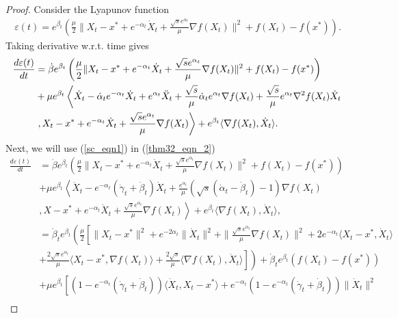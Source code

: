 \documentclass{article}
\theoremstyle{plain}
\theoremstyle{definition}
\theoremstyle{remark}
\begin{document}
\begin{proof}
    Consider the Lyapunov function
    \begin{align}\label{thm32_eqn_1}
        \varepsilon(t) = e^{\beta_t}\left(\frac{\mu}{2}\|X_t-x^*+e^{-\alpha_t}\dot X_t+\frac{\sqrt{s}e^{\alpha_t}}{\mu}\nabla f(X_t)\|^2+f(X_t)-f(x^*)\right).
    \end{align}
    Taking derivative w.r.t. time gives
    \begin{align}\label{thm32_eqn_2}
       \frac{d\varepsilon(t)}{dt}&=\dot \beta e^{\beta_t}\left(\frac{\mu}{2}\|X_t-x^*+e^{-\alpha_t}\dot X_t+\frac{\sqrt{s}e^{\alpha_t}}{\mu}\nabla f(X_t)\|^2+f(X_t)-f(x^*)\right)\nonumber\\
       & + \mu e^{\beta_t}\left\langle \dot X_t-\dot \alpha_t e^{-\alpha_t}\dot X_t + e^{\alpha_t}\Ddot{X}_t +\frac{\sqrt{s}}{\mu}\dot \alpha_te^{\alpha_t}\nabla f(X_t)+\frac{\sqrt{s}}{\mu}e^{\alpha_t}\nabla ^2f(X_t)\dot X_t\right.\nonumber\\
       &\left. ,X_t-x^*+e^{-\alpha_t}\dot X_t+\frac{\sqrt{s}e^{\alpha_t}}{\mu}\nabla f(X_t)\right\rangle+e^{\beta_t}\langle \nabla f(X_t),\dot X_t \rangle.
    \end{align}
    Next, we will use (\ref{sc_eqn1}) in (\ref{thm32_eqn_2})
    \begin{align}\label{thm32_eqn_3}
        \frac{d\varepsilon(t)}{dt}&=\dot \beta e^{\beta_t}\left(\frac{\mu}{2}\|X_t-x^*+e^{-\alpha_t}\dot X_t+\frac{\sqrt{s}e^{\alpha_t}}{\mu}\nabla f(X_t)\|^2+f(X_t)-f(x^*)\right)\nonumber\\
       & + \mu e^{\beta_t}\left\langle \dot X_t-e^{-\alpha_t}(\dot \gamma_t+\dot \beta_t)\dot X_t  +\frac{e^{\alpha_t }}{\mu}(\sqrt{s}(\dot \alpha_t-\dot \beta_t)-1)\nabla f(X_t)\right.\nonumber\\
       &\left. ,X-x^*+e^{-\alpha_t}\dot X_t+\frac{\sqrt{s}e^{\alpha_t}}{\mu}\nabla f(X_t)\right\rangle+e^{\beta_t}\langle \nabla f(X_t),\dot X_t \rangle,\nonumber\\
   &= \dot \beta_t e^{\beta_t}\left(\frac{\mu}{2}\left[\|X_t-x^*\|^2+e^{-2\alpha_t}\|\dot X_t\|^2+\|\frac{\sqrt{s}e^{\alpha_t}}{\mu}\nabla f(X_t)\|^2+2e^{-\alpha_t}\langle X_t-x^*,\dot X_t\rangle\right.\right.\nonumber\\
   &\left.\left.+\frac{2\sqrt{s}e^{\alpha_t}}{\mu}\langle X_t-x^*,\nabla f(X_t) \rangle+ \frac{2\sqrt{s}}{\mu}\langle \nabla f(X_t),\dot X_t \rangle\right]\right)+\dot \beta_t e^{\beta_t} (f(X_t)-f(x^*) )\nonumber\\
   & +\mu e^{\beta_t}\left[ (1-e^{-\alpha_t}(\dot \gamma_t+\dot \beta_t))\langle \dot X_t,X_t-x^*\rangle+ e^{-\alpha_t}(1-e^{-\alpha_t}(\dot \gamma_t+\dot \beta_t))\|\dot X_t\|^2 \right.\nonumber\\

\end{align}
\end{proof}
\end{document}
